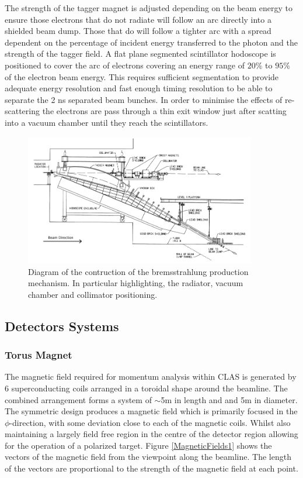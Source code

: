 The strength of the tagger magnet is adjusted depending on the beam energy to ensure those electrons that do not radiate will follow an arc directly into a shielded beam dump. Those that do will follow a tighter arc with a spread dependent on the percentage of incident energy transferred to the photon and the strength of the tagger field. A flat plane segmented scintillator hodoscope is positioned to cover the arc of electrons covering an energy range of $20\%$ to $95\%$ of the electron beam energy. This requires sufficient segmentation to provide adequate energy resolution and fast enough timing resolution to be able to separate the 2 ns separated beam bunches. In order to minimise the effects of re-scattering the electrons are pass through a thin exit window just after scatting into a vacuum chamber until they reach the scintillators. \cite{sober2000bremsstrahlung}


\begin{figure}
	\centering
	\includegraphics[width=0.9\textwidth]{ImgChap1/BremFac}
	\caption{Diagram of the contruction of the bremsstrahlung production mechanism. In particular highlighting, the radiator, vacuum chamber and collimator positioning. \cite{sober2000bremsstrahlung}}
	\label{CLASbrem1}
\end{figure}


\subsection{Detectors Systems}


\subsubsection{Torus Magnet} \cite{street1996final} \cite{o1989superconducting}

The magnetic field required for momentum analysis within CLAS is generated by 6 superconducting coils arranged in a toroidal shape around the beamline. The combined arrangement forms a system of $\sim$5m in length and and 5m in diameter. The symmetric design produces a magnetic field which is primarily focused in the $\phi$-direction, with some deviation close to each of the magnetic coils. Whilst also maintaining a largely field free region in the centre of the detector region allowing for the operation of a polarized target. Figure \ref{MagneticFields1} shows the vectors of the magnetic field from the viewpoint along the beamline. The length of the vectors are proportional to the strength of the magnetic field at each point.

